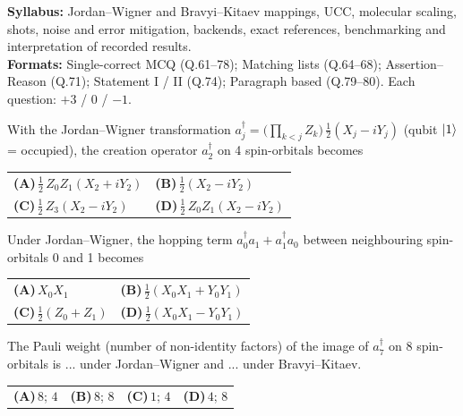 \documentclass[11pt,a4paper]{article}
\newcommand{\optlabel}[1]{\textbf{(#1)}}
\newenvironment{qitem}[1]{\begin{list}{}{\setlength{\leftmargin}{3.3em}\setlength{\labelwidth}{3.1em}%
  \setlength{\labelsep}{0.2em}\setlength{\topsep}{3pt}\setlength{\parsep}{3pt}}\item[\textbf{Q.#1}\hfill]}{\end{list}}
\newcommand{\qsep}{\par\vspace{2pt}{\color{black!15}\hrule}\vspace{4pt}}
\begin{document}
{\small \textbf{Syllabus:} Jordan--Wigner and Bravyi--Kitaev mappings, UCC, molecular scaling, shots, noise and error mitigation, backends, exact references, benchmarking and interpretation of recorded results.\\ \textbf{Formats:} Single-correct MCQ (Q.61--78); Matching lists (Q.64--68); Assertion--Reason (Q.71); Statement I / II (Q.74); Paragraph based (Q.79--80). Each question: $+3$ / $0$ / $-1$.}
\par\medskip

\begin{qitem}{61}
With the Jordan--Wigner transformation $a_j^\dagger = \big(\prod_{k<j}Z_k\big)\,\tfrac12(X_j - iY_j)$ (qubit $\ket1$ = occupied), the creation operator $a_2^\dagger$ on
4 spin-orbitals becomes
\par\smallskip\noindent\begin{tabularx}{\linewidth}{@{}*{2}{L}@{}}
\optlabel{A}\,$\tfrac12\,Z_0Z_1(X_2 + iY_2)$ & \optlabel{B}\,$\tfrac12(X_2 - iY_2)$ \\[3pt]
\optlabel{C}\,$\tfrac12\,Z_3(X_2 - iY_2)$ & \optlabel{D}\,$\tfrac12\,Z_0Z_1(X_2 - iY_2)$
\end{tabularx}
\end{qitem}
\qsep

\begin{qitem}{62}
Under Jordan--Wigner, the hopping term $a_0^\dagger a_1 + a_1^\dagger a_0$ between neighbouring spin-orbitals 0 and 1 becomes
\par\smallskip\noindent\begin{tabularx}{\linewidth}{@{}*{2}{L}@{}}
\optlabel{A}\,$X_0X_1$ & \optlabel{B}\,$\tfrac12(X_0X_1 + Y_0Y_1)$ \\[3pt]
\optlabel{C}\,$\tfrac12(Z_0 + Z_1)$ & \optlabel{D}\,$\tfrac12(X_0X_1 - Y_0Y_1)$
\end{tabularx}
\end{qitem}
\qsep

\begin{qitem}{63}
The Pauli weight (number of non-identity factors) of the image of $a_7^\dagger$ on 8 spin-orbitals is ... under Jordan--Wigner and ... under Bravyi--Kitaev.
\par\smallskip\noindent\begin{tabularx}{\linewidth}{@{}*{4}{L}@{}}
\optlabel{A}\,$8$; $4$ & \optlabel{B}\,$8$; $8$ & \optlabel{C}\,$1$; $4$ & \optlabel{D}\,$4$; $8$
\end{tabularx}
\end{qitem}
\qsep
\end{document}
